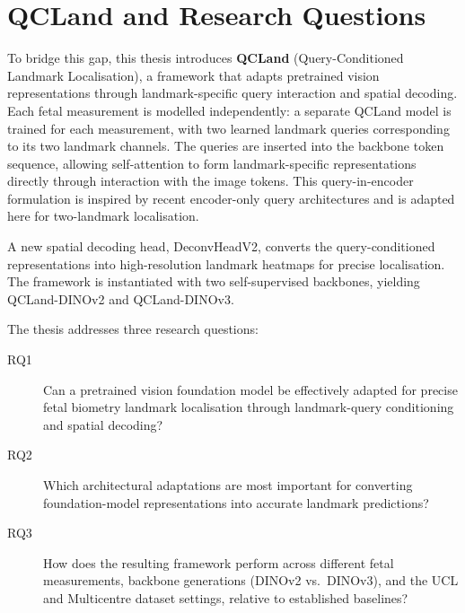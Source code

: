 
\section{QCLand and Research Questions}
\label{sec:intro-approach}

To bridge this gap, this thesis introduces \textbf{QCLand}
(Query-Conditioned Landmark Localisation), a framework that adapts
pretrained vision representations through landmark-specific query
interaction and spatial decoding. Each fetal measurement is modelled
independently: a separate QCLand model is trained for each
measurement, with two learned landmark queries corresponding to its
two landmark channels. The queries are inserted into the backbone
token sequence, allowing self-attention to form landmark-specific
representations directly through interaction with the image tokens.
This query-in-encoder formulation is inspired by recent encoder-only
query architectures \parencite{kerssies2025eomt} and is adapted here
for two-landmark localisation.

A new spatial decoding head, DeconvHeadV2, converts the
query-conditioned representations into high-resolution landmark
heatmaps for precise localisation. The framework is instantiated with
two self-supervised backbones, yielding QCLand-DINOv2 and
QCLand-DINOv3.

The thesis addresses three research questions:

\begin{description}

\item[RQ1] Can a pretrained vision foundation model be effectively
adapted for precise fetal biometry landmark localisation through
landmark-query conditioning and spatial decoding?

\item[RQ2] Which architectural adaptations are most important for
converting foundation-model representations into accurate landmark
predictions?

\item[RQ3] How does the resulting framework perform across
different fetal measurements, backbone generations
(DINOv2 vs.\ DINOv3), and the UCL and Multicentre dataset
settings, relative to established baselines?

\end{description}

